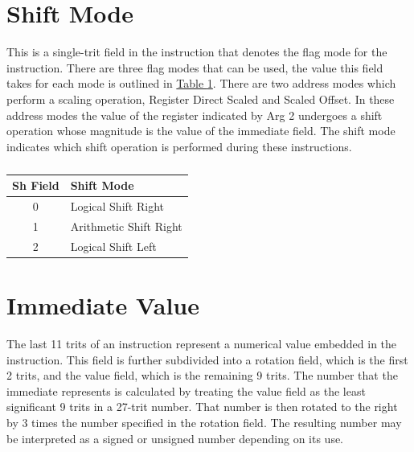 \documentclass[12pt]{article}
\begin{document}
\section{Shift Mode} \label{sec:Shift Mode}

This is a single-trit field in the instruction that denotes the flag mode for the instruction.
There are three flag modes that can be used, the value this field takes for each mode is
outlined in \hyperref[tab:Shift Modes]{Table \ref{tab:Shift Modes}}. There are two address
modes which perform a scaling operation, Register Direct Scaled and Scaled Offset. In these
address modes the value of the register indicated by Arg 2 undergoes a shift operation whose
magnitude is the value of the immediate field. The shift mode indicates which shift operation
is performed during these instructions.

\begin{table}[h!]
    \centering
    \caption{}
    \label{tab:Shift Modes}
    \begin{tabular}{|c|l|}
        \hline
        \textbf{Sh} Field & Shift Mode \\ \hline
        0 & Logical Shift Right \\ \hline
        1 & Arithmetic Shift Right \\ \hline
        2 & Logical Shift Left \\ \hline
    \end{tabular}
\end{table}

\section{Immediate Value} \label{sec:Immediate Value}

The last 11 trits of an instruction represent a numerical value embedded in the
instruction. This field is further subdivided into a rotation field, which is the
first 2 trits, and the value field, which is the remaining 9 trits. The number that
the immediate represents is calculated by treating the value field as the least
significant 9 trits in a 27-trit number. That number is then rotated to the right
by 3 times the number specified in the rotation field. The resulting number may be 
interpreted as a signed or unsigned number depending on its use.

%

%

%

%
\end{document}
